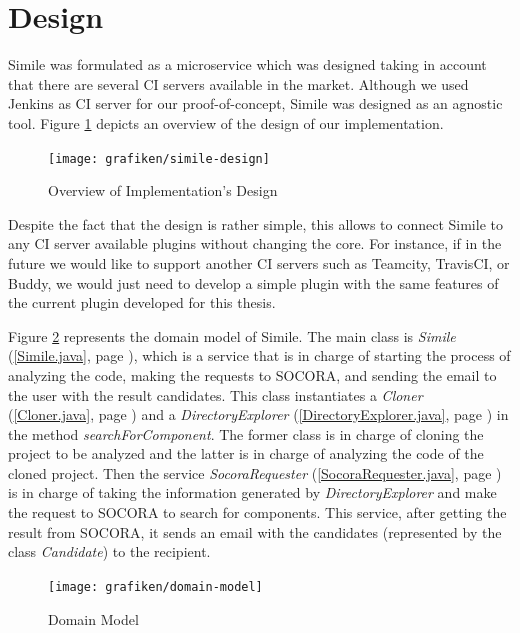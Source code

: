 \section{Design}
Simile was formulated as a microservice which was designed taking in account that there are several CI servers available in the market. Although we used Jenkins as CI server for our proof-of-concept, Simile was designed as an agnostic tool. Figure \ref{fig:simile-design} depicts an overview of the design of our implementation.

\begin{figure}[H]
	\centering
    \texttt{[image: grafiken/simile-design]}
    \caption{Overview of Implementation's Design}
    \label{fig:simile-design}
\end{figure}

Despite the fact that the design is rather simple, this allows to connect Simile to any CI server available plugins without changing the core. For instance, if in the future we would like to support another CI servers such as Teamcity, TravisCI, or Buddy, we would just need to develop a simple plugin with the same features of the current plugin developed for this thesis.

Figure \ref{fig:domain-model} represents the domain model of Simile. The main class is \emph{Simile} (\ref{Simile.java}, page \pageref{Simile.java}), which is a service that is in charge of starting the process of analyzing the code, making the requests to SOCORA, and sending the email to the user with the result candidates. This class instantiates a \emph{Cloner} (\ref{Cloner.java}, page \pageref{Cloner.java}) and a \emph{DirectoryExplorer} (\ref{DirectoryExplorer.java}, page \pageref{DirectoryExplorer.java}) in the method \emph{searchForComponent}. The former class is in charge of cloning the project to be analyzed and the latter is in charge of analyzing the code of the cloned project. Then the service \emph{SocoraRequester} (\ref{SocoraRequester.java}, page \pageref{SocoraRequester.java}) is in charge of taking the information generated by \emph{DirectoryExplorer} and make the request to SOCORA to search for components. This service, after getting the result from SOCORA, it sends an email with the candidates (represented by the class \emph{Candidate}) to the recipient. 

\begin{figure}[H]
	\centering
    \texttt{[image: grafiken/domain-model]}
    \caption{Domain Model}
    \label{fig:domain-model}
\end{figure}

